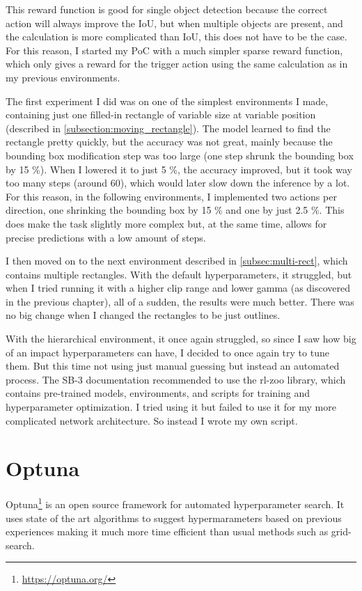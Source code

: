 \documentclass[
  digital,     %
  oneside,     %
  nosansbold,  %
  nocolorbold, %
  lof,         %
  lot,         %
]{fithesis4}
\begin{document}
This reward function is good for single object detection because the correct action will always improve the IoU, but when multiple objects are present, and the calculation is more complicated than IoU, this does not have to be the case. For this reason, I started my PoC with a much simpler sparse reward function, which only gives a reward for the trigger action using the same calculation as in my previous environments.

The first experiment I did was on one of the simplest environments I made, containing just one filled-in rectangle of variable size at variable position (described in \ref{subsection:moving_rectangle}). The model learned to find the rectangle pretty quickly, but the accuracy was not great, mainly because the bounding box modification step was too large (one step shrunk the bounding box by 15 \%). When I lowered it to just 5 \%, the accuracy improved, but it took way too many steps (around 60), which would later slow down the inference by a lot. For this reason, in the following environments, I implemented two actions per direction, one shrinking the bounding box by 15 \% and one by just 2.5 \%. This does make the task slightly more complex but, at the same time, allows for precise predictions with a low amount of steps.

I then moved on to the next environment described in \ref{subsec:multi-rect}, which contains multiple rectangles. With the default hyperparameters, it struggled, but when I tried running it with a higher clip range and lower gamma (as discovered in the previous chapter), all of a sudden, the results were much better. There was no big change when I changed the rectangles to be just outlines.

With the hierarchical environment, it once again struggled, so since I saw how big of an impact hyperparameters can have, I decided to once again try to tune them. But this time not using just manual guessing but instead an automated process. The SB-3 documentation recommended to use the rl-zoo library, which contains pre-trained models, environments, and scripts for training and hyperparameter optimization. I tried using it but failed to use it for my more complicated network architecture. So instead I wrote my own script.

\section{Optuna}
Optuna\footnote{\url{https://optuna.org/}} is an open source framework for automated hyperparameter search. It uses state of the art algorithms to suggest hypermarameters based on previous experiences making it much more time efficient than usual methods such as grid-search. 
\end{document}
